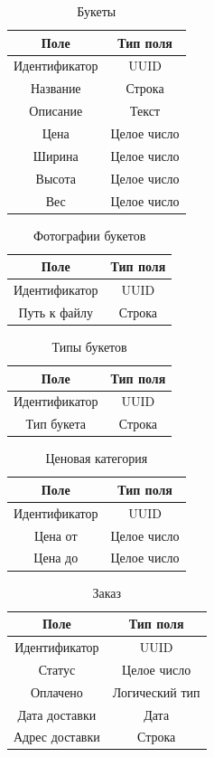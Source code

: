 \begin{table}[!h]
	\centering
	\caption{Букеты}
	\begin{tabular}{|c|c|}
		\hline
		Поле & Тип поля \\ \hline
		Идентификатор & UUID \\ \hline
		Название & Строка \\ \hline
		Описание & Текст \\ \hline
		Цена & Целое число \\ \hline
		Ширина & Целое число \\ \hline
		Высота & Целое число \\ \hline
		Вес & Целое число \\ \hline
	\end{tabular}
\end{table}

\begin{table}[!h]
	\centering
	\caption{Фотографии букетов}
	\begin{tabular}{|c|c|}
		\hline
		Поле & Тип поля \\ \hline
		Идентификатор & UUID \\ \hline
		Путь к файлу & Строка \\ \hline
	\end{tabular}
\end{table}

\begin{table}[!h]
	\centering
	\caption{Типы букетов}
	\begin{tabular}{|c|c|}
		\hline
		Поле & Тип поля \\ \hline
		Идентификатор & UUID \\ \hline
		Тип букета & Строка \\ \hline
	\end{tabular}
\end{table}

\begin{table}[!h]
	\centering
	\caption{Ценовая категория}
	\begin{tabular}{|c|c|}
		\hline
		Поле & Тип поля \\ \hline
		Идентификатор & UUID \\ \hline
		Цена от & Целое число \\ \hline
		Цена до & Целое число \\ \hline		
	\end{tabular}
\end{table}

\begin{table}[!h]
	\centering
	\caption{Заказ}
	\begin{tabular}{|c|c|}
		\hline
		Поле & Тип поля \\ \hline
		Идентификатор & UUID \\ \hline
		Статус & Целое число \\ \hline
		Оплачено & Логический тип \\ \hline
		Дата доставки & Дата \\ \hline
		Адрес доставки & Строка \\ \hline
	\end{tabular}
\end{table}


